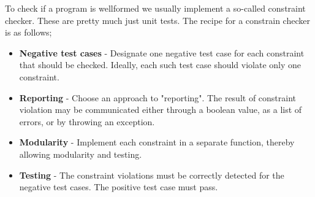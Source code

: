             \newpage
            To check if a program is wellformed we usually implement a so-called constraint checker. These are pretty much just unit tests.
            The recipe for a constrain checker is as follows;
            \begin{itemize}
                \item \textbf{Negative test cases} - Designate one negative test case for each constraint that should be checked. 
                Ideally, each such test case should violate only one constraint.
                \item \textbf{Reporting} - Choose an approach to "reporting". The result of constraint violation may be communicated either through
                                        a boolean value, as a list of errors, or by throwing an exception.
                \item \textbf{Modularity} - Implement each constraint in a separate function, thereby allowing modularity and testing.
                \item \textbf{Testing} - The constraint violations must be correctly detected for the negative test cases. The positive test case must pass.
            \end{itemize}

    